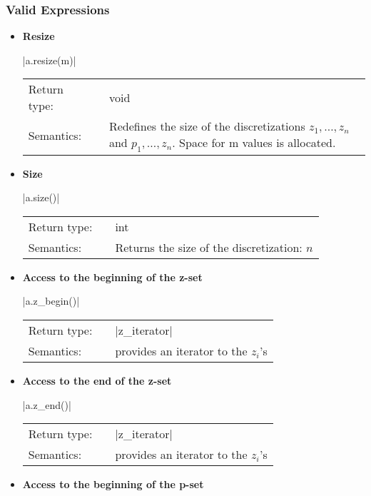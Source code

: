 \documentclass[12pt,twoside]{report}
\begin{document}
\htmlrule[CLEAR=all]  \subsubsection*{Valid Expressions}
\begin{itemize}

\item {\bf Resize}
  
  |a.resize(m)|

  \begin{tabular}[!h]{l p{1cm} p{10cm}}
    Return type: & & void\\
    Semantics: & & Redefines the size of the discretizations $z_1,\ldots,z_n$ and $p_1,\ldots,z_n$. Space for m values is allocated.\\
  \end{tabular}
 

\item {\bf Size}
  
  |a.size()|

  \begin{tabular}[!h]{l p{1cm} p{10cm}}
    Return type: & & int\\
    Semantics: & & Returns the size of the discretization: $n$\\
  \end{tabular}
 

\item {\bf Access to the beginning of the z-set}
  
  |a.z_begin()|

  \begin{tabular}[!h]{l p{1cm} p{10cm}}
    Return type: & & |z_iterator|\\
    Semantics: & & provides an iterator to the $z_i$'s\\
  \end{tabular}
 
\item {\bf Access to the end of the z-set}
  
  |a.z_end()|

  \begin{tabular}[!h]{l p{1cm} p{10cm}}
    Return type: & & |z_iterator|\\
    Semantics: & & provides an iterator to the $z_i$'s\\
  \end{tabular}
 

\item {\bf Access to the beginning of the p-set}
  

\end{itemize}
\end{document}

